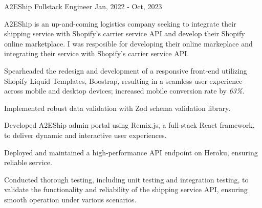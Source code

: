 \cventry
{A2EShip} %
{Fullstack Engineer} %
{ }
{Jan, 2022 - Oct, 2023}
{
	A2EShip is an up-and-coming logistics company seeking to integrate their shipping service with Shopify's carrier service API and develop their Shopify online marketplace. I was resposible for developing their online markeplace and integrating their service with Shopify's carrier service API.
	\begin{cvitemsdesc} %
		\item {Spearheaded the redesign and development of a responsive front-end utilizing Shopify Liquid Templates, Boostrap, resulting in a seamless user experience across mobile and desktop devices; increased mobile conversion rate by \emph{63\%}.}
		\item {Implemented robust data validation with Zod schema validation library.}
		\item {Developed A2EShip admin portal using Remix.js, a full-stack React framework, to deliver dynamic and interactive user experiences.}
		\item {Deployed and maintained a high-performance API endpoint on Heroku, ensuring reliable service.}
		\item {Conducted thorough testing, including unit testing and integration testing, to validate the functionality and reliability of the shipping service API, ensuring smooth operation under various scenarios.}
	\end{cvitemsdesc}
}
